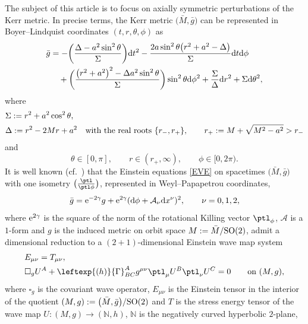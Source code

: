 The subject of this article is to focus on axially symmetric perturbations of the Kerr metric. In precise terms, the Kerr metric $\bigl(\bar{M}, \bar{g}\bigr)$ can be represented in Boyer--Lindquist coordinates $(t, r, \theta, \phi)$ as
\begin{align}
\bar{g} &{}= - \biggl(\frac{\Delta - a^2 \sin^2 \theta}{\Sigma} \biggr) {\rm d}t^2 - \frac{2a \sin^2 \theta \bigl(r^2 + a^2 -\Delta\bigr)}{\Sigma} {\rm d}t {\rm d}\phi \notag\\
&\quad{}+ \biggl(\frac{\bigl(r^2 +a^2\bigr)^2 -\Delta a^2 \sin^2 \theta}{\Sigma}\biggr) \sin^2 \theta {\rm d}\phi^2 + \frac{\Sigma}{\Delta} {\rm d}r^2 + \Sigma {\rm d}\theta^2, \label{BL-Kerr}
\end{align}
where
\begin{align*}
&\Sigma := r^2 + a^2 \cos^2 \theta, \\
&\Delta := r^2 -2Mr + a^2 \quad \textnormal{with the real roots} \ \{r_-,r_+\}, \qquad
 r_{+} := M + \sqrt{M^2- a^2} > r_{-}
\end{align*}
and
\[
\theta \in [0, \pi],\qquad r \in (r_+, \infty),\qquad \phi \in [0, 2\pi).
\]
It is well known (cf.\ \cite{YCB-VM96, Ycb-Mon_01, diss_13}) that the Einstein equations \eqref{EVE} on spacetimes $\bigl(\bar{M}, \bar{g}\bigr)$ with one isometry $\bigl(\frac{\ptl}{\ptl \phi}\bigr)$, represented in Weyl--Papapetrou coordinates,
\begin{align*}
\bar{g} = {\rm e}^{-2\gamma} g + {\rm e}^{2\gamma} ({\rm d}\phi + \mathcal{A}_\nu {\rm d}x^\nu)^2, \qquad \nu= 0, 1, 2,
\end{align*}
where ${\rm e}^{2 \gamma}$ is the square of the norm of the rotational Killing vector $\ptl_\phi$, $\mathcal{A}$ is a $1$-form and $g$ is the induced metric on orbit space $M := \bar{M}/{\rm SO}(2)$, admit a dimensional reduction to a $(2 + 1)$-dimensional Einstein wave map system
\begin{subequations} \label{ewm-system}
\begin{align}
&E_{\mu \nu} = T_{\mu \nu}, \\
&\square_g U^A + \leftexp{(h)}{\Gamma}^A_{BC} g^{\mu \nu} \ptl_\mu U^B \ptl_\nu U^C= 0 \qquad \text{on} \ (M, g),
\end{align}
\end{subequations}
where $\square_g$ is the covariant wave operator, $E_{\mu \nu}$ is the Einstein tensor in the interior of the quotient $(M, g) := \bigl(\bar{M}, \bar{g}\bigr)/ {\rm SO}(2)$ and $T$ is the stress energy tensor of the wave map $U \colon (M, g) \to (\mathbb{N}, h)$, $\mathbb{N}$ is the negatively curved hyperbolic $2$-plane,
